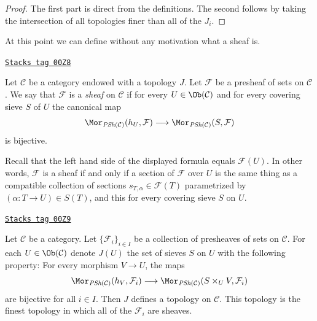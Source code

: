 \begin{proof}
The first part is direct from the definitions.
The second follows by taking the intersection
of all topologies finer than all of the $J_i$.
\end{proof}

At this point we can define
without any motivation what a sheaf is.

\begin{definition}
\label{sites-definition-sheaf-sets-topology}
\href{https://stacks.math.columbia.edu/tag/00Z8}{\texttt{Stacks tag 00Z8}}

Let $\mathcal{C}$ be a category endowed with a
topology $J$. Let $\mathcal{F}$ be a presheaf of sets
on $\mathcal{C}$.
We say that $\mathcal{F}$ is a
{\it sheaf} on $\mathcal{C}$
if for every $U \in \Ob(\mathcal{C})$ and for
every covering sieve $S$ of $U$ the canonical map
$$
\Mor_{\textit{PSh}(\mathcal{C})}(h_U, \mathcal{F})
\longrightarrow
\Mor_{\textit{PSh}(\mathcal{C})}(S, \mathcal{F})
$$
is bijective.
\end{definition}

Recall that the left hand side of the displayed
formula equals $\mathcal{F}(U)$. In other words, $\mathcal{F}$
is a sheaf if and only if a section of $\mathcal{F}$
over $U$ is the same thing as a compatible collection of sections
$s_{T, \alpha} \in \mathcal{F}(T)$ parametrized by
$(\alpha : T \to U) \in S(T)$, and this for every covering sieve $S$
on $U$.

\begin{lemma}
\label{sites-lemma-topology-presheaves-sheaves}
\href{https://stacks.math.columbia.edu/tag/00Z9}{\texttt{Stacks tag 00Z9}}

Let $\mathcal{C}$ be a category. Let $\{ \mathcal{F}_i \}_{i\in I}$ be a
collection of presheaves of sets on $\mathcal{C}$. For each
$U \in \Ob(\mathcal{C})$ denote
$J(U)$ the set of sieves $S$ on $U$ with the following property:
For every morphism $V \to U$, the maps
$$
\Mor_{\textit{PSh}(\mathcal{C})}(h_V, \mathcal{F}_i)
\longrightarrow
\Mor_{\textit{PSh}(\mathcal{C})}(S \times_U V, \mathcal{F}_i)
$$
are bijective for all $i \in I$. Then $J$ defines a
topology on $\mathcal{C}$. This topology is the finest
topology in which all of the $\mathcal{F}_i$ are sheaves.
\end{lemma}

